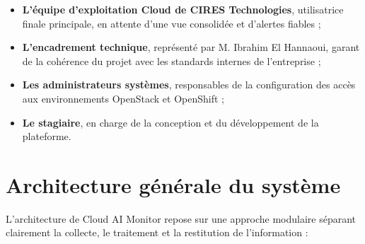 \documentclass[11pt,a4paper]{report}
\begin{document}
\begin{itemize}[label=\textbullet, leftmargin=1.5cm, labelsep=0.5cm,
                itemsep=0.2em, parsep=0em, topsep=0.2em]
    \item \textbf{L'équipe d'exploitation Cloud de CIRES Technologies},
    utilisatrice finale principale, en attente d'une vue consolidée et
    d'alertes fiables ;
    \item \textbf{L'encadrement technique}, représenté par M. Ibrahim El
    Hannaoui, garant de la cohérence du projet avec les standards internes de
    l'entreprise ;
    \item \textbf{Les administrateurs systèmes}, responsables de la
    configuration des accès aux environnements OpenStack et OpenShift ;
    \item \textbf{Le stagiaire}, en charge de la conception et du
    développement de la plateforme.
\end{itemize}

\section{Architecture générale du système}

L'architecture de Cloud AI Monitor repose sur une approche modulaire séparant
clairement la collecte, le traitement et la restitution de l'information :
\end{document}

